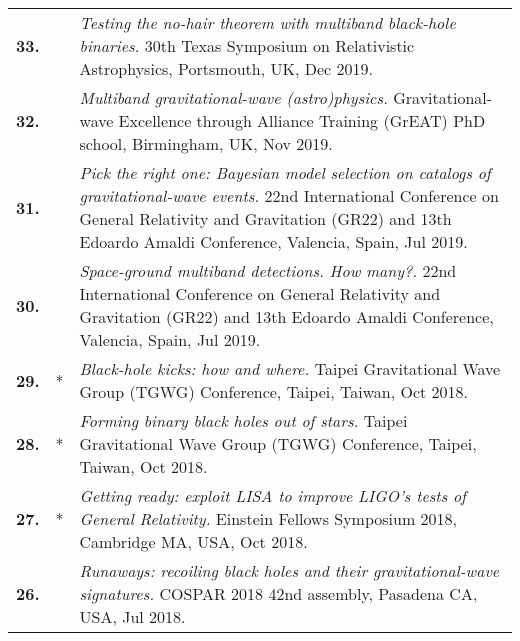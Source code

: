 {\begin{longtable}{rp{0.3cm}p{15.8cm}}
\textbf{33.} &  & \textit{Testing the no-hair theorem with multiband black-hole binaries.}
\newline{}
30th Texas Symposium on Relativistic Astrophysics, Portsmouth, UK, Dec 2019.
\vspace{0.05cm}\\
%
\textbf{32.} &  & \textit{Multiband gravitational-wave (astro)physics.}
\newline{}
Gravitational-wave Excellence through Alliance Training (GrEAT) PhD school, Birmingham, UK, Nov 2019.
\vspace{0.05cm}\\
%
\textbf{31.} &  & \textit{Pick the right one: Bayesian model selection on catalogs of gravitational-wave events.}
\newline{}
22nd International Conference on General Relativity and Gravitation (GR22) and 13th Edoardo Amaldi Conference, Valencia, Spain, Jul 2019.
\vspace{0.05cm}\\
%
\textbf{30.} &  & \textit{Space-ground multiband detections. How many?.}
\newline{}
22nd International Conference on General Relativity and Gravitation (GR22) and 13th Edoardo Amaldi Conference, Valencia, Spain, Jul 2019.
\vspace{0.05cm}\\
%
\textbf{29.} & * & \textit{Black-hole kicks: how and where.}
\newline{}
Taipei Gravitational Wave Group (TGWG) Conference, Taipei, Taiwan, Oct 2018.
\vspace{0.05cm}\\
%
\textbf{28.} & * & \textit{Forming binary black holes out of stars.}
\newline{}
Taipei Gravitational Wave Group (TGWG) Conference, Taipei, Taiwan, Oct 2018.
\vspace{0.05cm}\\
%
\textbf{27.} & * & \textit{Getting ready: exploit LISA to improve LIGO's tests of General Relativity.}
\newline{}
Einstein Fellows Symposium 2018, Cambridge MA, USA, Oct 2018.
\vspace{0.05cm}\\
%
\textbf{26.} &  & \textit{Runaways: recoiling black holes and their gravitational-wave signatures.}
\newline{}
COSPAR 2018 42nd assembly, Pasadena CA, USA, Jul 2018.
\vspace{0.05cm}\\

\end{longtable}}
